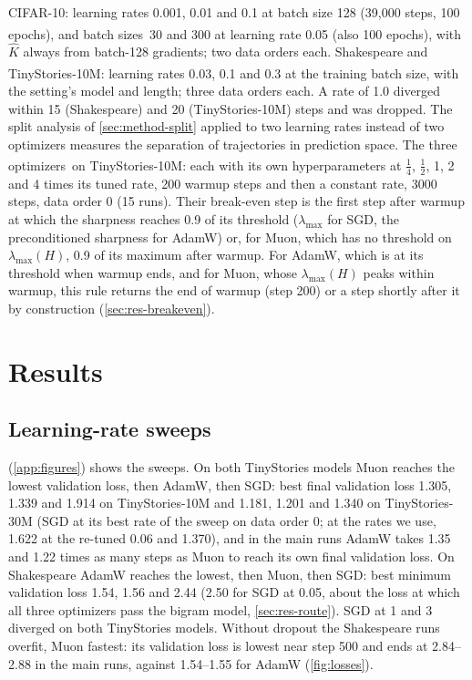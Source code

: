 \documentclass[10pt]{article}
\makeatletter
\renewcommand\paragraph{\@startsection{paragraph}{4}{\z@}{1.2ex \@plus .4ex \@minus .2ex}{-1em}{\normalfont\normalsize\bfseries}}
\newcommand{\extra}{\textsuperscript{\dag}}  %
\newcommand{\lmax}{\lambda_{\max}}
\makeatother
\begin{document}
\paragraph{Runs.} CIFAR-10: learning rates 0.001, 0.01 and 0.1 at batch size 128 (39{,}000 steps, 100
epochs), and batch sizes\extra\ 30 and 300 at learning rate 0.05 (also 100 epochs), with $\hat K$ always from
batch-128 gradients; two data orders each. Shakespeare and TinyStories-10M\extra: learning rates 0.03, 0.1 and 0.3
at the training batch size, with the setting's model and length; three data orders each. A rate of 1.0
diverged within 15 (Shakespeare) and 20 (TinyStories-10M) steps and was dropped. The split analysis
of \cref{sec:method-split} applied to two learning rates instead of two optimizers measures the separation of
trajectories in prediction space. The three optimizers\extra\ on TinyStories-10M: each with its own
hyperparameters at $\tfrac14$, $\tfrac12$, 1, 2 and 4 times its tuned rate, 200 warmup steps and then a constant rate,
3000 steps, data order 0 (15 runs). Their break-even step is the first step after warmup at which the sharpness
reaches 0.9 of its threshold ($\lmax$ for SGD, the preconditioned sharpness for AdamW) or, for Muon, which has no
threshold on $\lmax(H)$, 0.9 of its maximum after warmup. For AdamW, which is at its threshold when warmup ends,
and for Muon, whose $\lmax(H)$ peaks within warmup, this rule returns the end of warmup (step 200) or a step
shortly after it by construction (\cref{sec:res-breakeven}).

\FloatBarrier
\section{Results}
\label{sec:results}

\subsection{Learning-rate sweeps}
\label{sec:res-sweep}

 (\cref{app:figures}) shows the sweeps. On both TinyStories models Muon reaches the lowest
validation loss, then AdamW, then SGD: best final validation loss 1.305, 1.339 and 1.914 on TinyStories-10M and
1.181, 1.201 and 1.340 on TinyStories-30M (SGD at its best rate of the sweep on data order 0; at the rates we use, 1.622
at the re-tuned 0.06 and 1.370), and in the main runs AdamW takes 1.35 and 1.22 times as many steps as Muon to reach its own final
validation loss. On Shakespeare AdamW reaches the lowest, then Muon, then SGD: best minimum validation loss
1.54, 1.56 and 2.44 (2.50 for SGD at 0.05, about the loss at which all three optimizers pass the bigram model, \cref{sec:res-route}). SGD at 1 and 3 diverged on
both TinyStories models. Without dropout the Shakespeare runs overfit, Muon fastest: its validation loss is
lowest near step 500 and ends at 2.84--2.88 in the main runs, against 1.54--1.55 for AdamW (\cref{fig:losses}).
\end{document}
